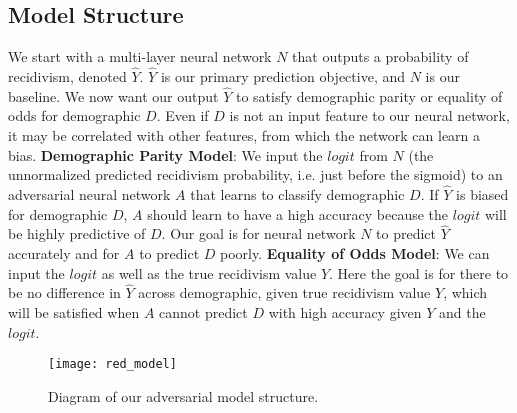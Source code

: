 \documentclass{article}
\begin{document}
\subsection{Model Structure} 
\vspace{-3mm}
We start with a multi-layer neural network $N$ that outputs a probability of recidivism, denoted $\hat{Y}$. $\hat{Y}$ is our primary prediction objective, and $N$ is our baseline. We now want our output $\hat{Y}$ to satisfy demographic parity or equality of odds for demographic $D$. Even if $D$ is not an input feature to our neural network, it may be correlated with other features, from which the network can learn a bias. 
\newline\textbf{Demographic Parity Model}: We input the $logit$ from $N$ (the unnormalized predicted recidivism probability, i.e. just before the sigmoid) to an adversarial neural network $A$ that learns to classify demographic $D$. If $\hat{Y}$ is biased for demographic $D$, $A$ should learn to have a high accuracy because the $logit$ will be highly predictive of $D$. Our goal is for neural network $N$ to predict $\hat{Y}$ accurately and for $A$ to predict $D$ poorly. \newline\textbf{Equality of Odds Model}: We can input the $logit$ as well as the true recidivism value $Y$. Here the goal is for there to be no difference in $\hat{Y}$ across demographic, given true recidivism value $Y$, which will be satisfied when $A$ cannot predict $D$ with high accuracy given $Y$ and the $logit$.


\begin{figure}[ht]
\vskip 0.2in
\begin{center}
\centerline{\texttt{[image: red\_model]}}
\caption{Diagram of our adversarial model structure.}
\label{model_structure}
\end{center}
\vskip -0.2in
\vspace{-5mm}
\end{figure}

\vspace{-3mm}
\end{document}
